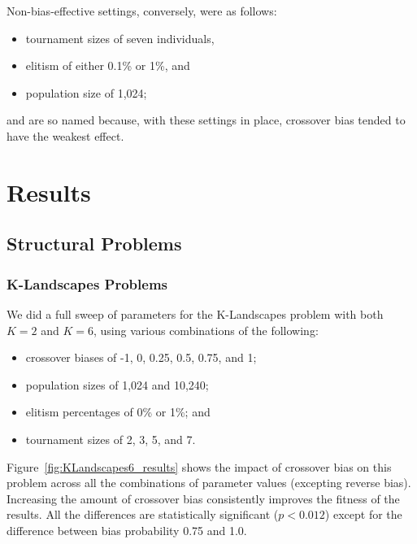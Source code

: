 \documentclass{sig-alternate}
\begin{document}
Non-bias-effective settings, conversely, were as follows:
\begin{itemize}
\item tournament sizes of seven individuals,
\item elitism of either 0.1\% or 1\%, and
\item population size of 1,024;
\end{itemize}
and are so named because, with these settings in place, crossover bias tended to have the weakest effect.

\section{Results} \label{sec:Results}

\subsection{Structural Problems}

\subsubsection{K-Landscapes Problems}

We did a full sweep of parameters for the K-Landscapes problem with both $K=2$ and $K=6$, using various combinations of the following:

\begin{itemize}
	\item crossover biases of -1, 0, 0.25, 0.5, 0.75, and 1;
	\item population sizes of 1,024 and 10,240;
	\item elitism percentages of 0\% or 1\%; and
	\item tournament sizes of 2, 3, 5, and 7.
\end{itemize}

Figure~\ref{fig:KLandscapes6_results} shows the impact of crossover bias on this problem across all the 
combinations of parameter values (excepting reverse bias). Increasing the amount of crossover bias consistently
improves the fitness of the results. All the differences are statistically significant ($p < 0.012$) except for the
difference between bias probability 0.75 and 1.0.

%
%
%
%
\end{document}
